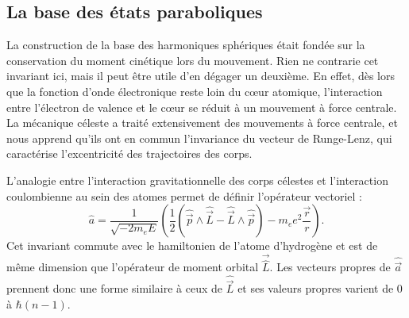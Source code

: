 \subsection{La base des états paraboliques}
\noindent	La construction de la base des harmoniques sphériques était fondée sur la conservation du moment cinétique lors du mouvement.
Rien ne contrarie cet invariant ici, mais il peut être utile d'en dégager un deuxième.
En effet, dès lors que la fonction d'onde électronique reste loin du c\oe ur atomique, l'interaction entre l'électron de valence et le c\oe ur se réduit à un mouvement à force centrale.
La mécanique céleste a traité extensivement des mouvements à force centrale, et nous apprend qu'ils ont en commun l'invariance du vecteur de Runge-Lenz, qui caractérise l'excentricité des trajectoires des corps.

L'analogie entre l'interaction gravitationnelle des corps célestes et l'interaction coulombienne au sein des atomes permet de définir l'opérateur vectoriel :
\begin{equation}\label{eq:RungeLenz}
\hat{a} = \frac{1}{\sqrt{-2m_e E}} \left( \frac{1}{2} (\hat{\vec{p}}\wedge\hat{\vec{L}} - \hat{\vec{L}}\wedge\hat{\vec{p}}) - m_e e^2 \frac{\vec{r}}{r} \right).
\end{equation}
Cet invariant commute avec le hamiltonien de l'atome d'hydrogène et est de même dimension que l'opérateur de moment orbital $\vec{\hat{L}}$.
Les vecteurs propres de $\hat{\vec{a}}$ prennent donc une forme similaire à ceux de $\hat{\vec{L}}$ et ses valeurs propres varient de $0$ à $\hbar(n-1)$.

